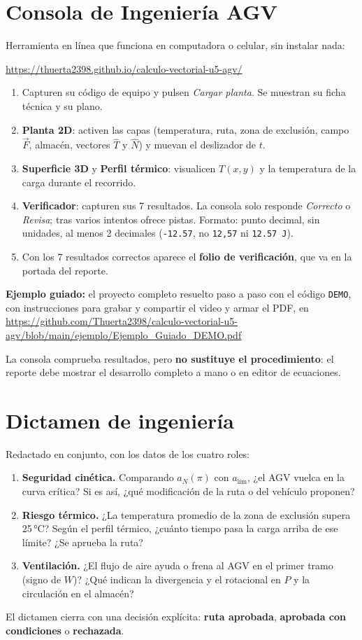\documentclass[11pt,letterpaper]{article}
\begin{document}
\section{Consola de Ingeniería AGV}
Herramienta en línea que funciona en computadora o celular, sin instalar nada:
\begin{center}\small\url{https://thuerta2398.github.io/calculo-vectorial-u5-agv/}\end{center}
\begin{enumerate}
\item Capturen su código de equipo y pulsen \emph{Cargar planta}. Se muestran su ficha técnica y su plano.
\item \textbf{Planta 2D}: activen las capas (temperatura, ruta, zona de exclusión, campo \(\vec F\), almacén, vectores \(\hat T\) y \(\hat N\)) y muevan el deslizador de \(t\).
\item \textbf{Superficie 3D} y \textbf{Perfil térmico}: visualicen \(T(x,y)\) y la temperatura de la carga durante el recorrido.
\item \textbf{Verificador}: capturen sus 7 resultados. La consola solo responde \emph{Correcto} o \emph{Revisa}; tras varios intentos ofrece pistas. Formato: punto decimal, sin unidades, al menos 2 decimales (\texttt{-12.57}, no \texttt{12,57} ni \texttt{12.57 J}).
\item Con los 7 resultados correctos aparece el \textbf{folio de verificación}, que va en la portada del reporte.
\end{enumerate}
\textbf{Ejemplo guiado:} el proyecto completo resuelto paso a paso con el código \texttt{DEMO}, con instrucciones para grabar y compartir el video y armar el PDF, en \url{https://github.com/Thuerta2398/calculo-vectorial-u5-agv/blob/main/ejemplo/Ejemplo_Guiado_DEMO.pdf}

La consola comprueba resultados, pero \textbf{no sustituye el procedimiento}: el reporte debe mostrar el desarrollo completo a mano o en editor de ecuaciones.

\section{Dictamen de ingeniería}
Redactado en conjunto, con los datos de los cuatro roles:
\begin{enumerate}
\item \textbf{Seguridad cinética.} Comparando \(a_N(\pi)\) con \(a_{\text{lím}}\), ¿el AGV vuelca en la curva crítica? Si es así, ¿qué modificación de la ruta o del vehículo proponen?
\item \textbf{Riesgo térmico.} ¿La temperatura promedio de la zona de exclusión supera 25\,°C? Según el perfil térmico, ¿cuánto tiempo pasa la carga arriba de ese límite? ¿Se aprueba la ruta?
\item \textbf{Ventilación.} ¿El flujo de aire ayuda o frena al AGV en el primer tramo (signo de \(W\))? ¿Qué indican la divergencia y el rotacional en \(P\) y la circulación en el almacén?
\end{enumerate}
El dictamen cierra con una decisión explícita: \textbf{ruta aprobada}, \textbf{aprobada con condiciones} o \textbf{rechazada}.
\end{document}
